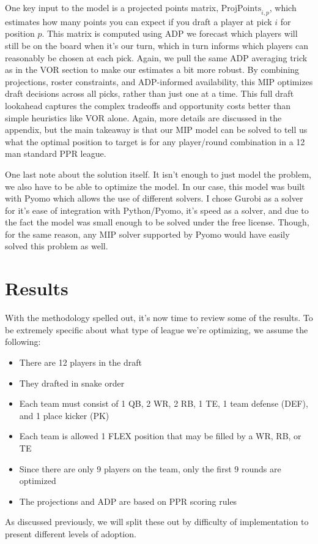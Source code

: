 \documentclass{article}
\begin{document}
One key input to the model is a projected points matrix, \(\text{ProjPoints}_{i,p}\), which estimates how many points you can expect if you draft a player at pick \(i\) for position \(p\).
This matrix is computed using ADP we forecast which players will still be on the board when it's our turn, which in turn informs which players can reasonably be chosen at each pick.
Again, we pull the same ADP averaging trick as in the VOR section to make our estimates a bit more robust.
By combining projections, roster constraints, and ADP-informed availability, this MIP optimizes draft decisions across all picks, rather than just one at a time.
This full draft lookahead captures the complex tradeoffs and opportunity costs better than simple heuristics like VOR alone.
Again, more details are discussed in the appendix, but the main takeaway is that our MIP model can be solved to tell us what the optimal position to target is for any player/round combination in a 12 man standard PPR league.

One last note about the solution itself.
It isn't enough to just model the problem, we also have to be able to optimize the model.
In our case, this model was built with Pyomo which allows the use of different solvers.
I chose Gurobi as a solver for it's ease of integration with Python/Pyomo, it's speed as a solver, and due to the fact the model was small enough to be solved under the free license.
Though, for the same reason, any MIP solver supported by Pyomo would have easily solved this problem as well.

\section{Results}
With the methodology spelled out, it's now time to review some of the results.
To be extremely specific about what type of league we're optimizing, we assume the following:
\begin{itemize}
  \item There are 12 players in the draft
  \item They drafted in snake order
  \item Each team must consist of 1 QB, 2 WR, 2 RB, 1 TE, 1 team defense (DEF), and 1 place kicker (PK)
  \item Each team is allowed 1 FLEX position that may be filled by a WR, RB, or TE
  \item Since there are only 9 players on the team, only the first 9 rounds are optimized
  \item The projections and ADP are based on PPR scoring rules
\end{itemize}
As discussed previously, we will split these out by difficulty of implementation to present different levels of adoption.
\end{document}
